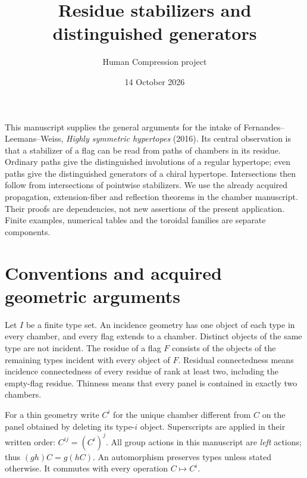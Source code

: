 \documentclass[11pt,a4paper]{article}
\title{Residue stabilizers and distinguished generators}
\author{Human Compression project}
\date{14 October 2026}
\begin{document}
\maketitle

This manuscript supplies the general arguments for the intake of
Fernandes--Leemans--Weiss, \emph{Highly symmetric hypertopes} (2016).
Its central observation is that a stabilizer of a flag can be read from
paths of chambers in its residue.  Ordinary paths give the distinguished
involutions of a regular hypertope; even paths give the distinguished
generators of a chiral hypertope.  Intersections then follow from
intersections of pointwise stabilizers.  We use the already acquired
propagation, extension-fiber and reflection theorems in the chamber
manuscript.  Their proofs are dependencies, not new assertions of the
present application.  Finite examples, numerical tables and the toroidal
families are separate components.

\section{Conventions and acquired geometric arguments}

Let $I$ be a finite type set.  An incidence geometry has one object of each
type in every chamber, and every flag extends to a chamber.  Distinct
objects of the same type are not incident.  The residue of a flag $F$
consists of the objects of the remaining types incident with every object
of $F$.  Residual connectedness means incidence connectedness of every
residue of rank at least two, including the empty-flag residue.  Thinness
means that every panel is contained in exactly two chambers.

For a thin geometry write $C^i$ for the unique chamber different from $C$
on the panel obtained by deleting its type-$i$ object.  Superscripts are
applied in their written order: $C^{ij}=(C^i)^j$.  All group actions in this
manuscript are \emph{left} actions; thus $(gh)C=g(hC)$.  An automorphism
preserves types unless stated otherwise.  It commutes with every operation
$C\mapsto C^i$.
\end{document}
